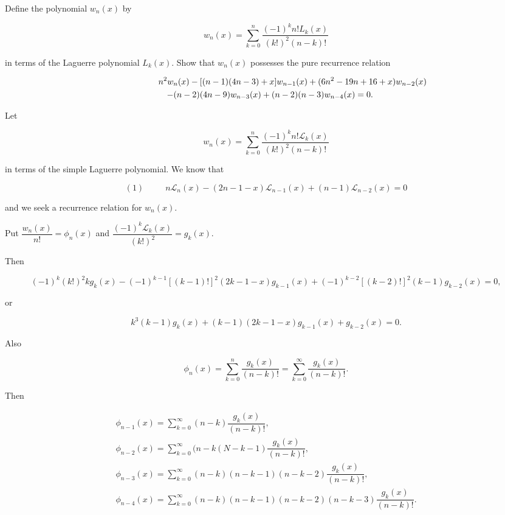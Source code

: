 \begin{problem}\label{problem5chapter14}
Define the polynomial $w_n(x)$ by

$$w_n(x) = \displaystyle\sum_{k=0}^n \dfrac{(-1)^k n! L_k(x)}{(k!)^2 (n-k)!}$$

in terms of the Laguerre polynomial $L_k(x)$. Show that $w_n(x)$ possesses the pure recurrence relation

\begin{eqnarray*}
\lefteqn{n^2 w_n(x) - [(n-1)(4n-3)+x]w_{n-1}(x)+(6n^2-19n+16+x)w_{n-2}(x)} \\
& & -(n-2)(4n-9)w_{n-3}(x)+(n-2)(n-3)w_{n-4}(x)=0.
\end{eqnarray*}
\end{problem}
\begin{solution}
Let 

$$w_n(x) = \displaystyle\sum_{k=0}^n \dfrac{(-1)^k n! \mathscr{L}_k(x)}{(k!)^2(n-k)!}$$

in terms of the simple Laguerre polynomial. We know that

$$(1) \hspace{30pt} n\mathscr{L}_n(x) - (2n-1-x)\mathscr{L}_{n-1}(x) + (n-1)\mathscr{L}_{n-2}(x) = 0$$

and we seek a recurrence relation for $w_n(x).$

Put $\dfrac{w_n(x)}{n!} = \phi_n(x)$ and $\dfrac{(-1)^k \mathscr{L}_k(x)}{(k!)^2} = g_k(x).$

Then

$$(-1)^k (k!)^2kg_k(x) - (-1)^{k-1}[(k-1)!]^2 (2k-1-x)g_{k-1}(x) + (-1)^{k-2}[(k-2)!]^2(k-1)g_{k-2}(x)=0,$$

or

$$k^3(k-1)g_k(x) +(k-1)(2k-1-x)g_{k-1}(x)+g_{k-2}(x)=0.$$

Also

$$\phi_n(x) = \displaystyle\sum_{k=0}^n \dfrac{g_k(x)}{(n-k)!} = \displaystyle\sum_{k=0}^{\infty} \dfrac{g_k(x)}{(n-k)!}.$$

Then

$$\begin{array}{ll}
\phi_{n-1}(x) = \displaystyle\sum_{k=0}^{\infty} (n-k) \dfrac{g_k(x)}{(n-k)!}, \\
\phi_{n-2}(x) = \displaystyle\sum_{k=0}^{\infty} (n-k(N-k-1) \dfrac{g_k(x)}{(n-k)!},\\
\phi_{n-3}(x) = \displaystyle\sum_{k=0}^{\infty} (n-k)(n-k-1)(n-k-2) \dfrac{g_k(x)}{(n-k)!}, \\
\phi_{n-4}(x) = \displaystyle\sum_{k=0}^{\infty} (n-k)(n-k-1)(n-k-2)(n-k-3) \dfrac{g_k(x)}{(n-k)!}.
\end{array}$$


\end{solution}
